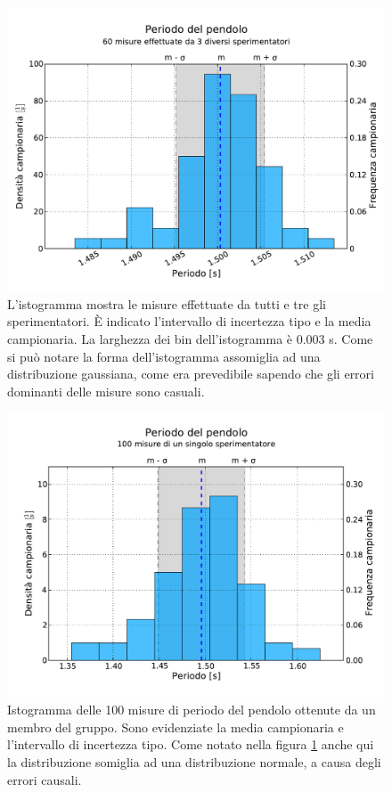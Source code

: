\begin{figure}[][p]
	\centering
	\includegraphics[width=120mm]{grafici/Pendolo.pdf}
	\caption{L'istogramma mostra le misure effettuate da tutti e tre gli sperimentatori.
        È indicato l'intervallo di incertezza tipo e la media campionaria. La larghezza
        dei bin dell'istogramma è 0.003 s. Come si può notare la forma dell'istogramma
        assomiglia ad una distribuzione gaussiana, come era prevedibile sapendo che gli
        errori dominanti delle misure sono casuali.}
    \label{fig:pendolo}
\end{figure}

\begin{figure}[][p]
	\centering
	\includegraphics[width=120mm]{grafici/Pendolo100.pdf}
	\caption{Istogramma delle 100 misure di periodo del pendolo ottenute
        da un membro del gruppo. Sono evidenziate la media campionaria
        e l'intervallo di incertezza tipo. Come notato nella figura \ref{fig:pendolo}
        anche qui la distribuzione somiglia ad una distribuzione normale,
        a causa degli errori causali.}
    \label{fig:pendolo100}
\end{figure}

